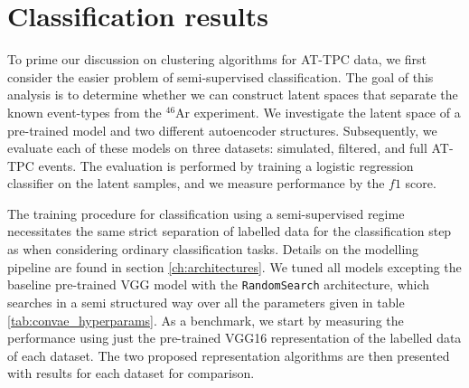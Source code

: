 
\chapter{Classification results}\label{chap:classification}

To prime our discussion on clustering algorithms for AT-TPC data, we first consider the easier problem of semi-supervised classification. The goal of this analysis is to determine whether we can construct latent spaces that separate the known event-types from the ${}^{46}$Ar experiment. We investigate the latent space of a pre-trained model and two different autoencoder structures. Subsequently, we evaluate each of these models on three datasets: simulated, filtered, and full AT-TPC events. The evaluation is performed by training a logistic regression classifier on the latent samples, and we measure performance by the $f1$ score. 

The training procedure for classification using a semi-supervised regime necessitates the same strict separation of labelled data for the classification step as when considering ordinary classification tasks. Details on the modelling pipeline are found in section \ref{ch:architectures}. We tuned all models excepting the baseline pre-trained VGG model with the \lstinline{RandomSearch} architecture, which searches in a semi structured way over all the parameters given in table \ref{tab:convae_hyperparams}. As a benchmark, we start by measuring the performance using just the pre-trained VGG16 representation of the labelled data of each dataset. The two proposed representation algorithms are then presented with results for each dataset for comparison. 
